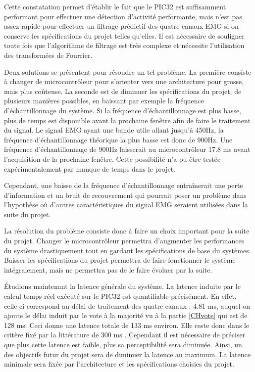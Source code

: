 \documentclass[letterpaper, twoside, 12pt, memoire, creativecommons, hyperref]{thETS}
\begin{document}
Cette constatation permet d'établir le fait que le PIC32 est suffisamment performant pour effectuer une détection d'activité performante, mais n'est pas assez rapide pour effectuer un filtrage prédictif des quatre canaux EMG si on conserve les spécifications du projet telles qu'elles. Il est nécessaire de souligner toute fois que l'algorithme de filtrage est très complexe et nécessite l'utilisation des transformées de Fourrier.

Deux solutions se présentent pour résoudre un tel problème. La première consiste à changer de microcontrôleur pour s'orienter vers une architecture pour grosse, mais plus coûteuse. La seconde est de diminuer les spécifications du projet, de plusieurs manières possibles, en baissant par exemple la fréquence d'échantillonnage du système. Si la fréquence d'échantillonnage est plus basse, plus de temps est disponible avant la prochaine fenêtre afin de faire le traitement du signal. Le signal EMG ayant une bande utile allant jusqu'à 450Hz, la fréquence d'échantillonnage théorique la plus basse est donc de 900Hz. Une fréquence d'échantillonnage de 900Hz laisserait au microcontrôleur 17.8 ms avant l'acquisition de la prochaine fenêtre. Cette possibilité n'a pu être testée expérimentalement par manque de temps dans le projet.

Cependant, une baisse de la fréquence d'échantillonnage entraînerait une perte d'information et un bruit de recouvrement qui pourrait poser un  problème dans l'hypothèse où d'autres caractéristiques du signal EMG seraient utilisées dans la suite du projet. 

La résolution du problème consiste donc à faire un choix important pour la suite du projet. Changer le microcontrôleur permettra d'augmenter les performances du système drastiquement tout en gardant les spécifications de base du systèmes. Baisser les spécifications du projet permettra de faire fonctionner le système intégralement, mais ne permettra pas de le faire évoluer par la suite. 

Étudions maintenant la latence générale du système. La latence induite par le calcul temps réel exécuté sur le PIC32 est quantifiable précisément. En effet, celle-ci correspond au délai de traitement des quatre canaux : 4.81 ms, auquel on ajoute le délai induit par le vote à la majorité vu à la partie \ref{CHvote} qui est de 128 ms. Ceci donne une latence totale de 133 ms environ. Elle reste donc dans le critère fixé par la littérature de 300 ms \citep{Englehart2003}. Cependant il est nécessaire de préciser que plus cette latence est faible, plus sa perceptibilité sera diminuée. Ainsi, un des objectifs futur du projet sera de diminuer la latence au maximum. La latence minimale sera fixée par l'architecture et les spécifications choisies du projet.
\end{document}

